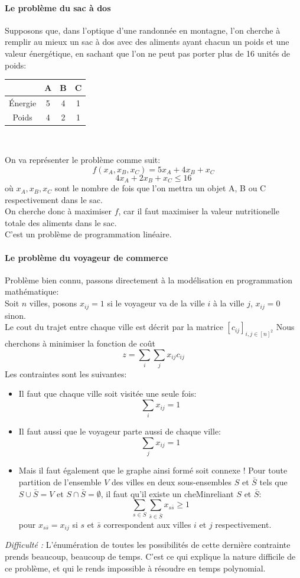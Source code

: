 \documentclass[a4paper]{report}
\begin{document}
\paragraph{Le problème du sac à dos} Supposons que, dans l'optique d'une
randonnée en montagne, l'on cherche à remplir au mieux un sac à dos avec des
aliments ayant chacun un poids et une valeur énergétique, en sachant que l'on ne
peut pas porter plus de 16 unités de poids:
\begin{center}
\begin{tabular}{|c|c|c|c|}
\hline
 & A & B & C \\
\hline
Énergie & 5 & 4 & 1 \\
\hline
Poids & 4 & 2 & 1 \\
\hline
\end{tabular}
\\
\end{center}
On va représenter le problème comme suit:
\[f(x_A, x_B, x_C) =5x_A + 4x_B + x_C\]
\[4x_A + 2x_B + x_C \le 16\]
où \(x_A,x_B,x_C\) sont le nombre de fois que l'on mettra un objet A, B ou C
respectivement dans le sac.\\
On cherche donc à maximiser \(f\), car il faut maximiser la valeur nutritionelle
totale des aliments dans le sac.\\
C'est un problème de programmation linéaire.
\paragraph{Le problème du voyageur de commerce} Problème bien connu, passons
directement à la modélisation en programmation mathématique:\\
Soit \(n\) villes, posons \(x_{ij} = 1\) si le voyageur va de la ville \(i\) à
la ville \(j\), \(x_{ij} = 0\) sinon.\\
Le cout du trajet entre chaque ville est décrit par la matrice
\([c_{ij}]_{i,j\in[n]^2}\)
Nous cherchons à minimiser la fonction de coût
\[z=\sum_i\sum_j x_{ij}c_{ij}\]
Les contraintes sont les suivantes:
\begin{itemize}
	\item Il faut que chaque ville soit visitée une seule fois:
		\[\sum_i x_{ij} = 1\]
	\item Il faut aussi que le voyageur parte aussi de chaque ville:
		\[\sum_j x_{ij} = 1\]
	\item Mais il faut également que le graphe ainsi formé soit connexe ! Pour
		toute partition de l'ensemble \(V\) des villes en deux sous-ensembles
		\(S\) et \(\bar S\) tels que \(S\cup\bar S=V\) et
		\(S\cap\bar S=\emptyset\), il faut qu'il existe un cheMin\;reliant \(S\)
		et \(\bar S\):
		\[\sum_{s\in S}\sum_{\bar s\in\bar S}x_{s\bar s}\ge 1\]
		pour \(x_{s\bar s}=x_{ij}\) si \(s\) et \(\bar s\) correspondent aux
		villes \(i\) et \(j\) respectivement.\\
\end{itemize}
\emph{Difficulté :} L'énumération de toutes les possibilités de cette dernière
contrainte prends beaucoup, beaucoup de temps. C'est ce qui explique la nature
difficile de ce problème, et qui le rends impossible à résoudre en temps
polynomial.
\end{document}

